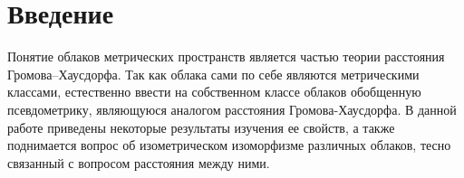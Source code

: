 \section*{Введение} 
	Понятие облаков метрических пространств является частью теории расстояния Громова--Хаусдорфа. Так как облака сами по себе являются метрическими классами, естественно ввести на собственном классе облаков обобщенную псевдометрику, являющуюся аналогом расстояния Громова-Хаусдорфа.
	В данной работе приведены некоторые результаты изучения ее свойств, а также поднимается вопрос об изометрическом изоморфизме различных облаков, тесно связанный с вопросом расстояния между ними. 